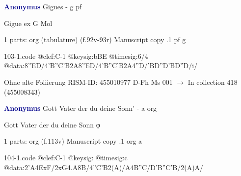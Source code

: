 \documentclass[twocolumn]{book}
\begin{document}
\newline \par \vspace{7pt} \textcolor{darkblue}{\textbf{Anonymus  }}
\newline Gigues - g
\newline pf
\newline \begin{itshape} Gigue ex G Mol\end{itshape} 
\newline \textcolor{darkblue}{}  1 parts: org (tabulature)  (f.92v-93r)
\newline Manuscript copy
.1  pf  g  
\begin{filecontents*}{103-1.code}
@clef:C-1
@keysig:bBE
@timesig:6/4
@data:{8''ED}/4'B''C'B2A{8''ED}/4'B''C'B2A4''D/'BD''D'BD''D/i/
\end{filecontents*}
\newline
%

\newline Ohne alte Foliierung
\newline RISM-ID: 455010977
\newline D-Fh  Ms 001
\newline $\rightarrow$ In collection 418 (455008343)
      
\newline \par \vspace{7pt} \textcolor{darkblue}{\textbf{Anonymus  }}
\newline Gott Vater der du deine Sonn' - a
\newline org
\newline \begin{itshape}[f.113v, heading:] Gott Vater der du deine Sonn φ\end{itshape} 
\newline \textcolor{darkblue}{}  1 parts: org  (f.113v)
\newline Manuscript copy
.1  org  a  
\begin{filecontents*}{104-1.code}
@clef:C-1
@keysig:
@timesig:c
@data:2'A4ExF/2xG4.A8B/4''C'B2(A)/A4B''C/D'B''C'B/2(A)A/
\end{filecontents*}
\newline
%
\end{document}
